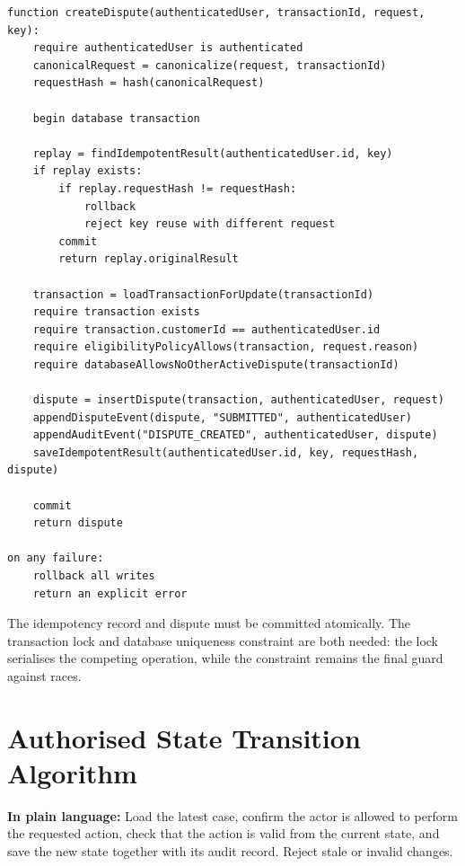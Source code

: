 \documentclass[11pt,a4paper]{article}
\begin{document}
\begin{lstlisting}[style=pseudocode,caption={Creating a dispute safely}]
function createDispute(authenticatedUser, transactionId, request, key):
    require authenticatedUser is authenticated
    canonicalRequest = canonicalize(request, transactionId)
    requestHash = hash(canonicalRequest)

    begin database transaction

    replay = findIdempotentResult(authenticatedUser.id, key)
    if replay exists:
        if replay.requestHash != requestHash:
            rollback
            reject key reuse with different request
        commit
        return replay.originalResult

    transaction = loadTransactionForUpdate(transactionId)
    require transaction exists
    require transaction.customerId == authenticatedUser.id
    require eligibilityPolicyAllows(transaction, request.reason)
    require databaseAllowsNoOtherActiveDispute(transactionId)

    dispute = insertDispute(transaction, authenticatedUser, request)
    appendDisputeEvent(dispute, "SUBMITTED", authenticatedUser)
    appendAuditEvent("DISPUTE_CREATED", authenticatedUser, dispute)
    saveIdempotentResult(authenticatedUser.id, key, requestHash, dispute)

    commit
    return dispute

on any failure:
    rollback all writes
    return an explicit error
\end{lstlisting}

The idempotency record and dispute must be committed atomically. The
transaction lock and database uniqueness constraint are both needed:
the lock serialises the competing operation, while the constraint
remains the final guard against races.

\section{Authorised State Transition Algorithm}

\textbf{In plain language:} Load the latest case, confirm the actor is
allowed to perform the requested action, check that the action is valid
from the current state, and save the new state together with its audit
record. Reject stale or invalid changes.
\end{document}
